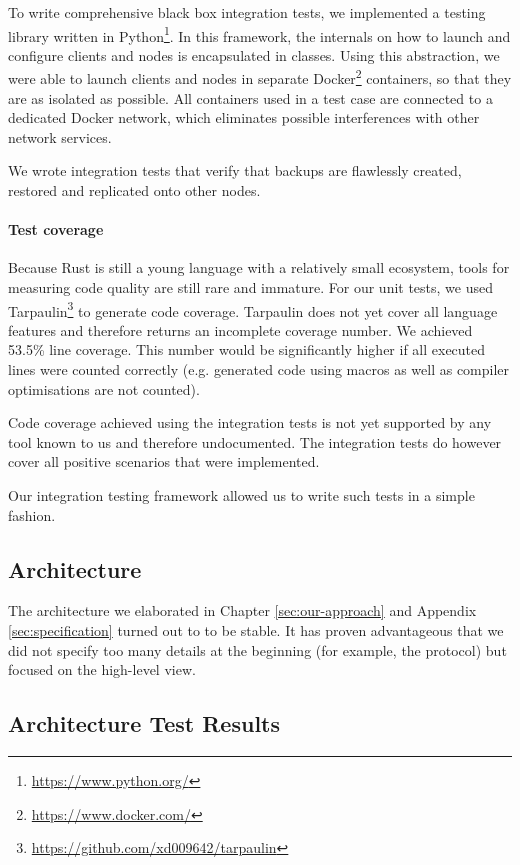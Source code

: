 To write comprehensive black box integration tests, we implemented a testing library written in Python\footnote{\url{https://www.python.org/}}. In this framework, the internals on how to launch and configure \glspl{client} and \glspl{node} is encapsulated in classes. Using this abstraction, we were able to launch \glspl{client} and \glspl{node} in separate Docker\footnote{\url{https://www.docker.com/}} containers, so that they are as isolated as possible. All containers used in a test case are connected to a dedicated Docker network, which eliminates possible interferences with other network services.

We wrote integration tests that verify that backups are flawlessly created, restored and replicated onto other \glspl{node}.

\paragraph{Test coverage}

Because Rust is still a young language with a relatively small ecosystem, tools for measuring code quality are still rare and immature. For our unit tests, we used Tarpaulin\footnote{\url{https://github.com/xd009642/tarpaulin}} to generate code coverage. Tarpaulin does not yet cover all language features and therefore returns an incomplete coverage number. We achieved 53.5\% line coverage. This number would be significantly higher if all executed lines were counted correctly  (e.g. generated code using macros as well as compiler optimisations are not counted).

Code coverage achieved using the integration tests is not yet supported by any tool known to us and therefore undocumented. The integration tests do however cover all positive scenarios that were implemented.

Our integration testing framework allowed us to write such tests in a simple fashion.

\subsection{Architecture}

The architecture we elaborated in Chapter \ref{sec:our-approach} and Appendix \ref{sec:specification} turned out to to be stable. It has proven advantageous that we did not specify too many details at the beginning (for example, the protocol) but focused on the high-level view.

\subsection{Architecture Test Results}

